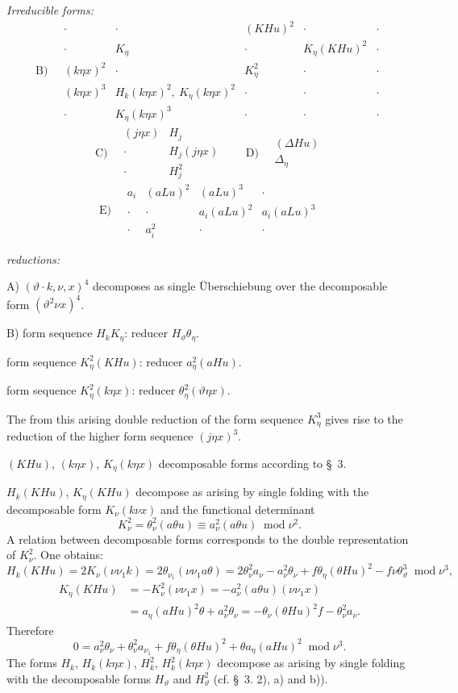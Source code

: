 \documentclass[11pt]{article}
\newcommand{\A}{\Delta}
\newcommand{\modu}[1]{\;\operatorname{mod} #1}
\begin{document}
\noindent\emph{Irreducible forms:}
\[
\text{B)}\quad
\begin{array}{c|c|c|c|c}
\cdot&\cdot&(KHu)^2&\cdot&\cdot\\
\cdot&K_\eta&\cdot&K_\eta(KHu)^2&\cdot\\
(k\eta x)^2&\cdot&K_\eta^2&\cdot&\cdot\\
(k\eta x)^3&H_k(k\eta x)^2,\ K_\eta(k\eta x)^2&\cdot&\cdot&\cdot\\
\cdot&K_\eta(k\eta x)^3&\cdot&\cdot&\cdot
\end{array}
\]
\[
\text{C)}\quad
\begin{array}{cc}
(j\eta x)&H_j\\
\cdot&H_j(j\eta x)\\
\cdot&H_j^2
\end{array}
\qquad
\text{D)}\quad
\begin{array}{c}
(\A Hu)\\\A_\eta
\end{array}
\]
\[
\text{E)}\quad
\begin{array}{cccc}
a_i&(aLu)^2&(aLu)^3&\cdot\\
\cdot&\cdot&a_i(aLu)^2&a_i(aLu)^3\\
\cdot&a_i^2&\cdot&\cdot
\end{array}
\]

\noindent\emph{reductions:}

\noindent A) $(\vartheta\cdot k,\nu,x)^4$ decomposes as single Überschiebung over the decomposable form $(\vartheta^2\nu x)^4$.

\noindent B) form sequence $H_kK_\eta$: reducer $H_\vartheta\theta_\eta$.

form sequence $K_\eta^2(KHu)$: reducer $a_\eta^2(aHu)$.

form sequence $K_\eta^2(k\eta x)$: reducer $\theta_\eta^2(\vartheta\eta x)$.

The from this arising double reduction of the form sequence $K_\eta^3$ gives rise to the reduction of the higher form sequence $(j\eta x)^3$.

$(KHu)$, $(k\eta x)$, $K_\eta(k\eta x)$ decomposable forms according to \S\ 3.

$H_k(KHu)$, $K_\eta(KHu)$ decompose as arising by single folding with the decomposable form $K_\nu(k\nu x)$ and the functional determinant
\[
K_\nu^2=\theta_\nu^2(a\theta u)\equiv a_\nu^2(a\theta u)\modu{\nu^2}.
\]
A relation between decomposable forms corresponds to the double representation of $K_\nu^2$. One obtains:
\[
H_k(KHu)=2K_\nu(\nu\nu_1k)=2\theta_{\nu_1}(\nu\nu_1a\theta)
=2\theta_\nu^2a_\nu-a_\nu^2\theta_\nu+f\theta_\eta(\theta Hu)^2-f\nu\theta_\vartheta^3
\modu{\nu^3},
\]
\[
\begin{aligned}
K_\eta(KHu)&=-K_\nu^2(\nu\nu_1x)
=-a_\nu^2(a\theta u)(\nu\nu_1x)\\
&=a_\eta(aHu)^2\theta+a_\nu^2\theta_\nu
=-\theta_\nu(\theta Hu)^2f-\theta_\nu^2a_\nu.
\end{aligned}
\]
Therefore
\[
\tag{17}
0=a_\nu^2\theta_\nu+\theta_\nu^2a_{\nu_1}+f\theta_\eta(\theta Hu)^2+\theta a_\eta(aHu)^2\modu{\nu^3}.
\]
The forms $H_k$, $H_k(k\eta x)$, $H_k^2$, $H_k^2(k\eta x)$ decompose as arising by single folding with the decomposable forms $H_\vartheta$ and $H_\vartheta^2$ (cf. \S\ 3. 2), a) and b)).
\end{document}
